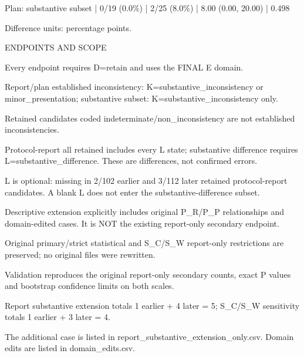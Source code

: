\documentclass[10pt,a4paper]{article}
\begin{document}
Plan: substantive subset | 0/\allowbreak{}19 (0.\allowbreak{}0\%) | 2/\allowbreak{}25 (8.\allowbreak{}0\%) | 8.\allowbreak{}00 (0.\allowbreak{}00, 20.\allowbreak{}00) | 0.\allowbreak{}498\par
Difference units: percentage points.\allowbreak{}\par
ENDPOINTS AND SCOPE\par
Every endpoint requires D=retain and uses the FINAL E domain.\allowbreak{}\par
Report/\allowbreak{}plan established inconsistency: K=substantive\_\allowbreak{}inconsistency or minor\_\allowbreak{}presentation; substantive subset: K=substantive\_\allowbreak{}inconsistency only.\allowbreak{}\par
Retained candidates coded indeterminate/\allowbreak{}non\_\allowbreak{}inconsistency are not established inconsistencies.\allowbreak{}\par
Protocol-\allowbreak{}report all retained includes every L state; substantive difference requires L=substantive\_\allowbreak{}difference.\allowbreak{} These are differences, not confirmed errors.\allowbreak{}\par
L is optional: missing in 2/\allowbreak{}102 earlier and 3/\allowbreak{}112 later retained protocol-\allowbreak{}report candidates.\allowbreak{} A blank L does not enter the substantive-\allowbreak{}difference subset.\allowbreak{}\par
Descriptive extension explicitly includes original P\_\allowbreak{}R/\allowbreak{}P\_\allowbreak{}P relationships and domain-\allowbreak{}edited cases.\allowbreak{} It is NOT the existing report-\allowbreak{}only secondary endpoint.\allowbreak{}\par
Original primary/\allowbreak{}strict statistical and S\_\allowbreak{}C/\allowbreak{}S\_\allowbreak{}W report-\allowbreak{}only restrictions are preserved; no original files were rewritten.\allowbreak{}\par
Validation reproduces the original report-\allowbreak{}only secondary counts, exact P values and bootstrap confidence limits on both scales.\allowbreak{}\par
Report substantive extension totals 1 earlier + 4 later = 5; S\_\allowbreak{}C/\allowbreak{}S\_\allowbreak{}W sensitivity totals 1 earlier + 3 later = 4.\allowbreak{}\par
The additional case is listed in report\_\allowbreak{}substantive\_\allowbreak{}extension\_\allowbreak{}only.\allowbreak{}csv.\allowbreak{} Domain edits are listed in domain\_\allowbreak{}edits.\allowbreak{}csv.\allowbreak{}\par
\end{document}
